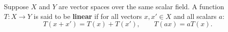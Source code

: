 Suppose $X$ and $Y$ are vector spaces over the same scalar field. A function $T: X \to Y$ is said to be \textbf{linear} if for all vectors $x, x' \in X$ and all scalars $a$:
$$T(x + x') = T(x) + T(x'), \qquad T(ax) = a T(x).$$
